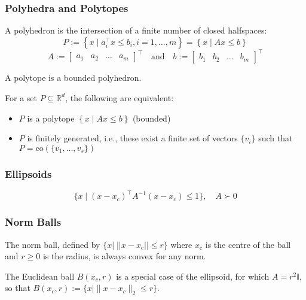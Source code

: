\subsubsection{Polyhedra and Polytopes}

A polyhedron is the intersection of a finite number of closed halfspaces:
\begin{equation*}
    P := \left\{ x \mid a_i^\top x \leq b_i, i = 1, \ldots, m \right\} = \left\{ x \mid Ax \leq b \right\}
\end{equation*}
\begin{equation*}
    A := \begin{bmatrix} a_1 & a_2 & \ldots & a_m \end{bmatrix}^\top \quad \text{and} \quad b := \begin{bmatrix} b_1 & b_2 & \ldots & b_m \end{bmatrix}^\top
\end{equation*}

A polytope is a bounded polyhedron.
\newpar{}

For a set $P\subseteq \mathbb{R}^d$, the following are equivalent:
\begin{itemize}
    \item $P$ is a polytope $\left\{ x \mid Ax \leq b \right\}$ (bounded)
    \item $P$ is finitely generated, i.e., these exist a finite set of vectors $\{v_i\}$ such that $P=\mathrm{co}(\{v_1, \dots, v_s\})$
\end{itemize}

\subsubsection{Ellipsoids}
\noindent
\begin{equation*}
    \{x \mid {(x - x_c)}^\top A^{-1}(x - x_c) \leq 1\}, \quad A\succ 0
\end{equation*}

\subsubsection{Norm Balls}
The norm ball, defined by $\{x|\;||x-x_{\mathrm{c}}||\leq r\}$ where $x_{\mathrm{c}}$ is the centre of the ball
and $r\geq0$ is the radius, is always convex for any norm.
\newpar{}

The Euclidean ball $B(x_c,r)$ is a special case of the ellipsoid, for which $A=r^2 \mathbb{I}$, so that $B(x_c,r):=\{x| \|x-x_c\|_2\leq r\}$.


